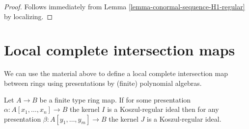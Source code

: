 \begin{proof}
Follows immediately from Lemma \ref{lemma-conormal-sequence-H1-regular}
by localizing.
\end{proof}







\section{Local complete intersection maps}
\label{section-lci}

\noindent
We can use the material above to define a local complete intersection
map between rings using presentations by (finite) polynomial algebras.

\begin{lemma}
\label{lemma-koszul-independence-presentation}
Let $A \to B$ be a finite type ring map. If for some presentation
$\alpha : A[x_1, \ldots, x_n] \to B$ the kernel $I$ is a Koszul-regular ideal
then for any presentation $\beta : A[y_1, \ldots, y_m] \to B$ the kernel
$J$ is a Koszul-regular ideal.
\end{lemma}

